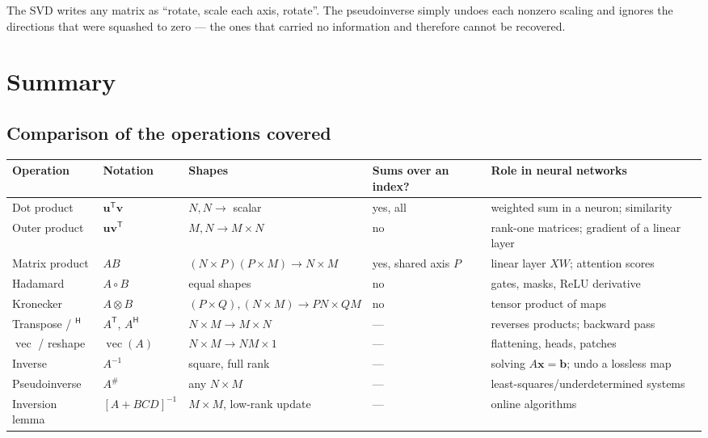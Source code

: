 \documentclass[11pt,a4paper]{article}
\newcommand{\T}{^{\mathsf{T}}}
\newcommand{\Her}{^{\mathsf{H}}}
\newcommand{\pinv}{^{\#}}
\newcommand{\vecop}{\operatorname{vec}}
\newcommand{\Had}{\circ}
\theoremstyle{definition}
\theoremstyle{plain}
\begin{document}
\begin{intuition}
The SVD writes any matrix as ``rotate, scale each axis, rotate''. The pseudoinverse simply undoes each nonzero scaling and ignores the directions that were squashed to zero --- the ones that carried no information and therefore cannot be recovered.
\end{intuition}

\section{Summary}

\subsection{Comparison of the operations covered}

\begin{center}
\footnotesize
\renewcommand{\arraystretch}{1.25}
\begin{tabular}{@{}p{2.6cm}p{2.5cm}p{3.1cm}p{2.3cm}p{3.6cm}@{}}
\toprule
Operation & Notation & Shapes & Sums over an index? & Role in neural networks\\\midrule
Dot product & $\mathbf u\T\mathbf v$ & $N,N\to$ scalar & yes, all & weighted sum in a neuron; similarity\\
Outer product & $\mathbf u\mathbf v\T$ & $M,N\to M\times N$ & no & rank-one matrices; gradient of a linear layer\\
Matrix product & $AB$ & $(N\times P)(P\times M)\to N\times M$ & yes, shared axis $P$ & linear layer $XW$; attention scores\\
Hadamard & $A\Had B$ & equal shapes & no & gates, masks, ReLU derivative\\
Kronecker & $A\otimes B$ & $(P\times Q),(N\times M)\to PN\times QM$ & no & tensor product of maps\\
Transpose / $\Her$ & $A\T$, $A\Her$ & $N\times M\to M\times N$ & --- & reverses products; backward pass\\
$\vecop$ / reshape & $\vecop(A)$ & $N\times M\to NM\times1$ & --- & flattening, heads, patches\\
Inverse & $A^{-1}$ & square, full rank & --- & solving $A\mathbf x=\mathbf b$; undo a lossless map\\
Pseudoinverse & $A\pinv$ & any $N\times M$ & --- & least-squares/underdetermined systems\\
Inversion lemma & $[A+BCD]^{-1}$ & $M\times M$, low-rank update & --- & online algorithms\\\bottomrule
\end{tabular}
\end{center}
\end{document}
